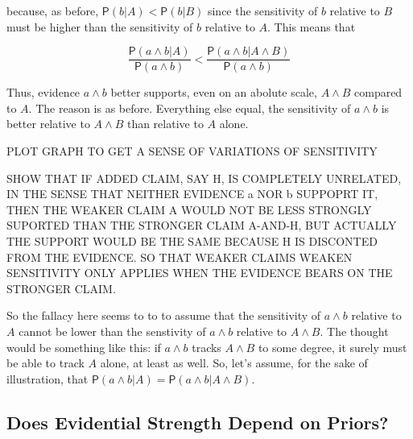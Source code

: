 \documentclass[10pt,dvipsnames,enabledeprecatedfontcommands]{scrartcl}
\newcommand{\pr}[1]{\mathsf{P}(#1)}
\begin{document}
\noindent because, as before, \(\pr{b \vert A} < \pr{b \vert B}\) since
the sensitivity of \(b\) relative to \(B\) must be higher than the
sensitivity of \(b\) relative to \(A\). This means that

\[\frac{\pr{a\wedge b \vert A}}{\pr{a\wedge b}} < \frac{\pr{a\wedge b \vert A \wedge B}}{\pr{a\wedge b}}   \]

\noindent Thus, evidence \(a\wedge b\) better supports, even on an
abolute scale, \(A \wedge B\) compared to \(A\). The reason is as
before. Everything else equal, the sensitivity of \(a\wedge b\) is
better relative to \(A \wedge B\) than relative to \(A\) alone.

PLOT GRAPH TO GET A SENSE OF VARIATIONS OF SENSITIVITY

SHOW THAT IF ADDED CLAIM, SAY H, IS COMPLETELY UNRELATED, IN THE SENSE
THAT NEITHER EVIDENCE a NOR b SUPPOPRT IT, THEN THE WEAKER CLAIM A WOULD
NOT BE LESS STRONGLY SUPORTED THAN THE STRONGER CLAIM A-AND-H, BUT
ACTUALLY THE SUPPORT WOULD BE THE SAME BECAUSE H IS DISCONTED FROM THE
EVIDENCE. SO THAT WEAKER CLAIMS WEAKEN SENSITIVITY ONLY APPLIES WHEN THE
EVIDENCE BEARS ON THE STRONGER CLAIM.

So the fallacy here seems to to to assume that the sensitivity of
\(a\wedge b\) relative to \(A\) cannot be lower than the senstivity of
\(a\wedge b\) relative to \(A\wedge B\). The thought would be something
like this: if \(a \wedge b\) tracks \(A\wedge B\) to some degree, it
surely must be able to track \(A\) alone, at least as well. So, let's
assume, for the sake of illustration, that
\(\pr{a\wedge b \vert A}=\pr{a\wedge b \vert A\wedge B}\).

\hypertarget{does-evidential-strength-depend-on-priors}{%
\subsection{Does Evidential Strength Depend on
Priors?}\label{does-evidential-strength-depend-on-priors}}
\end{document}
